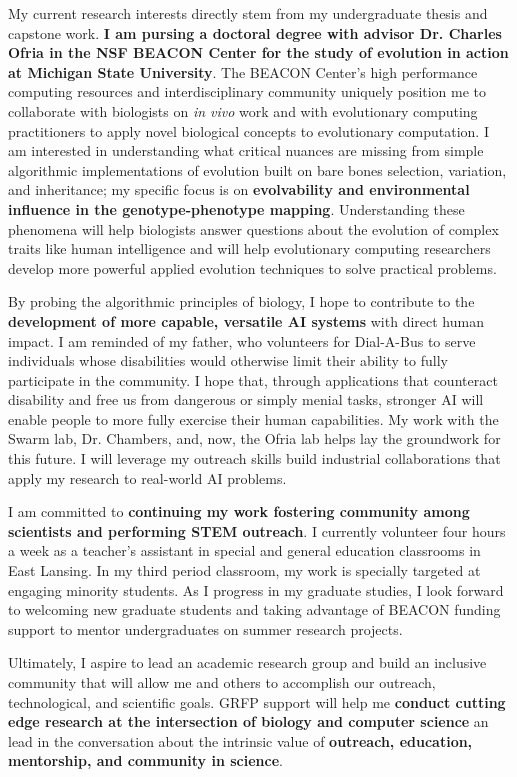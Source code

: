 \noindent
\underline{}
My current research interests directly stem from my undergraduate thesis and capstone work.
\textbf{I am pursing a doctoral degree with advisor Dr. Charles Ofria in the NSF BEACON Center for the study of evolution in action at Michigan State University}.
The BEACON Center's high performance computing resources and interdisciplinary community uniquely position me to collaborate with biologists on \textit{in vivo} work and with evolutionary computing practitioners to apply novel biological concepts to evolutionary computation.
I am interested in understanding what critical nuances are missing from simple algorithmic implementations of evolution built on bare bones selection, variation, and inheritance;
my specific focus is on \textbf{evolvability and environmental influence in the genotype-phenotype mapping}.
Understanding these phenomena will help biologists answer questions about the evolution of complex traits like human intelligence and will help evolutionary computing researchers develop more powerful applied evolution techniques to solve practical problems.

By probing the algorithmic principles of biology, I hope to contribute to the \textbf{development of more capable, versatile AI systems} with direct human impact.
I am reminded of my father, who volunteers for Dial-A-Bus to serve individuals whose disabilities would otherwise limit their ability to fully participate in the community.
I hope that, through applications that counteract disability and free us from dangerous or simply menial tasks, stronger AI will enable people to more fully exercise their human capabilities.
My work with the Swarm lab, Dr. Chambers, and, now, the Ofria lab helps lay the groundwork for this future.
I will leverage my outreach skills build industrial collaborations that apply my research to real-world AI problems.

I am committed to \textbf{continuing my work fostering community among scientists and performing STEM outreach}.
I currently volunteer four hours a week as a teacher's assistant in special and general education classrooms in East Lansing.
In my third period classroom, my work is specially targeted at engaging minority students.
As I progress in my graduate studies, I look forward to welcoming new graduate students and taking advantage of BEACON funding support to mentor undergraduates on summer research projects.

Ultimately, I aspire to lead an academic research group and build an inclusive community that will allow me and others to accomplish our outreach, technological, and scientific goals.
GRFP support will help me \textbf{conduct cutting edge research at the intersection of biology and computer science} an lead in the conversation about the intrinsic value of \textbf{outreach, education, mentorship, and community in science}.
